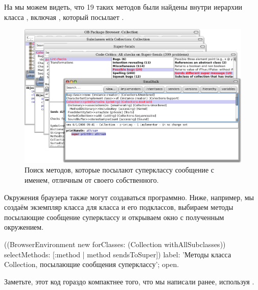 \documentclass[a4paper,10pt,twoside]{book}
\begin{document}
На  мы можем видеть, что 19 таких методов были найдены внутри иерархии класса , включая , который посылает .
\begin{figure}[ht]\centering
	\includegraphics[width=\linewidth]{sendDifferentSuper}
	\caption{Поиск методов, которые посылают суперклассу сообщение с именем, отличным от своего собственного.}
\end{figure}

Окружения браузера также могут создаваться программно.
Ниже, например, мы создаём экземпляр класса  для класса  и его подклассов, выбираем методы посылающие сообщение суперклассу и открываем окно с полученным окружением.
\begin{code}{}
((BrowserEnvironment new forClasses: (Collection withAllSubclasses))
	selectMethods: [:method | method sendsToSuper])
	label: 'Методы класса Collection, посылающие сообщения суперклассу';
	open.
\end{code}{}

Заметьте, этот код гораздо компактнее того, что мы написали ранее, используя .
\end{document}
